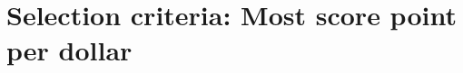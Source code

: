 \documentclass[Main]{subfiles}
\begin{document}
\section{Selection criteria: Most score point per dollar}
\end{document}
